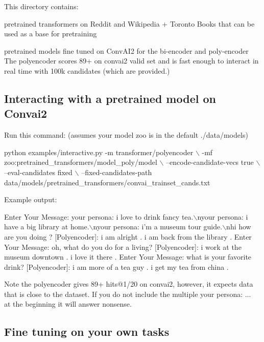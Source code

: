 This directory contains\+:
\begin{DoxyItemize}
\item pretrained transformers on Reddit and Wikipedia + Toronto Books that can be used as a base for pretraining
\item pretrained models fine tuned on Conv\+A\+I2 for the bi-\/encoder and poly-\/encoder The polyencoder scores 89+ on convai2 valid set and is fast enough to interact in real time with 100k candidates (which are provided.)
\end{DoxyItemize}

\subsection*{Interacting with a pretrained model on Convai2}

Run this command\+: (assumes your model zoo is in the default ./data/models) 
\begin{DoxyCode}
python examples/interactive.py -m transformer/polyencoder \(\backslash\)
    -mf zoo:pretrained\_transformers/model\_poly/model \(\backslash\)
    --encode-candidate-vecs true \(\backslash\)
    --eval-candidates fixed  \(\backslash\)
    --fixed-candidates-path data/models/pretrained\_transformers/convai\_trainset\_cands.txt
\end{DoxyCode}


Example output\+: 
\begin{DoxyCode}
Enter Your Message: your persona: i love to drink fancy tea.\(\backslash\)nyour persona: i have a big library at
       home.\(\backslash\)nyour persona: i'm a museum tour guide.\(\backslash\)nhi how are you doing ?
[Polyencoder]: i am alright . i am back from the library .
Enter Your Message: oh, what do you do for a living?
[Polyencoder]: i work at the museum downtown . i love it there .
Enter Your Message: what is your favorite drink?
[Polyencoder]: i am more of a tea guy . i get my tea from china .
\end{DoxyCode}


Note the polyencoder gives 89+ hits@1/20 on convai2, however, it expects data that is close to the dataset. If you do not include the multiple \textquotesingle{}your persona\+: ...~\newline
\textquotesingle{} at the beginning it will answer nonsense.

\subsection*{Fine tuning on your own tasks}

